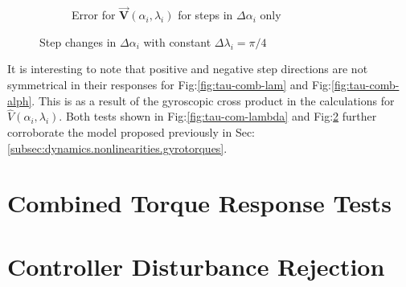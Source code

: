 \begin{figure}[htbp]
\begin{subfigure}{0.49\textwidth}
\caption{Error for $\vec{\mathbf{V}}(\alpha_i,\lambda_i)$ for steps in $\Delta\alpha_i$ only}
\label{fig:tau-comb-alph-r}
\end{subfigure}
\vspace{-6pt}
\caption{Step changes in $\Delta\alpha_i$ with constant $\Delta\lambda_i=\pi/4$}
\label{fig:tau-comb-alpha}
\vspace{-16pt}
\end{figure}
\par
It is interesting to note that positive and negative step directions are not symmetrical in their responses for Fig:\ref{fig:tau-comb-lam} and Fig:\ref{fig:tau-comb-alph}. This is as a result of the gyroscopic cross product in the calculations for $\hat{V}(\alpha_i,\lambda_i)$. Both tests shown in Fig:\ref{fig:tau-com-lambda} and Fig:\ref{fig:tau-comb-alpha} further corroborate the model proposed previously in Sec:\ref{subsec:dynamics.nonlinearities.gyrotorques}.
\newpage
\section{Combined Torque Response Tests}
\label{app:tau-comb-test}
\newpage
\section{Controller Disturbance Rejection}
\label{app:disturbance}
